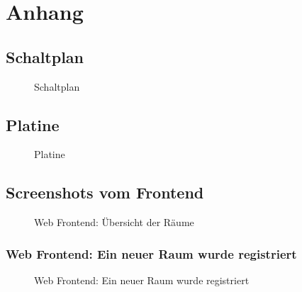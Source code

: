 \section{Anhang}



\subsection{Schaltplan}\label{Schaltplan}
\begin{figure}[H]
\centering
{}
\caption{Schaltplan}
\label{fig:schaltplan}
\end{figure}

\subsection{Platine}\label{Platine}
\begin{figure}[H]
\centering
{}
\caption{Platine}
\label{fig:platine}
\end{figure}


\subsection{Screenshots vom Frontend}\label{FrontendScreens}
\begin{figure}[H]
\centering
{}
\caption{Web Frontend: Übersicht der Räume}
\label{fig:FE_Rooms}
\end{figure}

\subsubsection{Web Frontend: Ein neuer Raum wurde registriert}
\begin{figure}[H]
\centering
{}
\caption{Web Frontend: Ein neuer Raum wurde registriert}
\label{fig:FE_NewRoom}
\end{figure}


